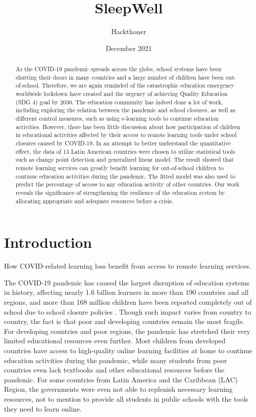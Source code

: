 \documentclass{article}
\title{SleepWell}
\author{Hackthoner}
\date{December 2021}
\begin{document}
\maketitle

\begin{abstract}
As the COVID-19 pandemic spreads across the globe, school systems have been shutting their doors in many countries and a large number of children have been out-of-school. Therefore, we are again reminded of the catastrophic education emergency worldwide lockdown have created and the urgency of achieving Quality Education (SDG 4) goal by 2030. The education community has indeed done a lot of work, including exploring the relation between the pandemic and school closures, as well as different control measures, such as using e-learning tools to continue education activities. However, there has been little discussion about how participation of children in educational activities affected by their access to remote learning tools under school closures caused by COVID-19. In an attempt to better understand the quantitative effect, the data of 13 Latin American countries were chosen to utilize statistical tools such as change point detection and generalized linear model. The result showed that remote learning services can greatly benefit learning for out-of-school children to continue education activities during the pandemic. The fitted model was also used to predict the percentage of access to any education activity of other countries. Our work reveals the significance of strengthening the resilience of the education system by allocating appropriate and adequate resources before a crisis.
\end{abstract}

\section{Introduction}
\label{Introduction}
How COVID-related learning loss benefit from access to remote learning services.


The COVID-19 pandemic has caused the largest disruption of education systems in history, affecting nearly 1.6 billion learners in more than 190 countries and all regions, and more than 168 million children have been reported completely out of school due to school closure policies \cite{Closure168}. Though such impact varies from country to country, the fact is that poor and developing countries remain the most fragile. For developing countries and poor regions, the pandemic has stretched their very limited educational resources even further. Most children from developed countries have access to high-quality online learning facilities at home to continue education activities during the pandemic, while many students from poor countries even lack textbooks and other educational resources before the pandemic\cite{AZUBUIKE2021100022}. For some countries from Latin America and the Caribbean (LAC) Region, the governments were even not able to replenish necessary learning resources, not to mention to provide all students in public schools with the tools they need to learn online.  
\end{document}
